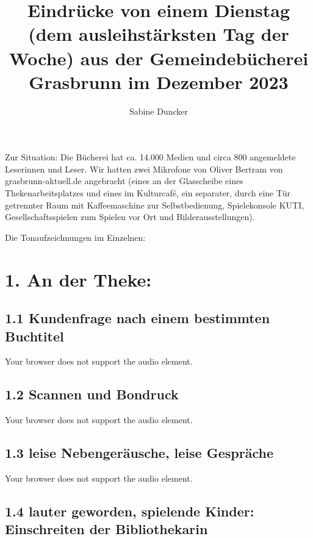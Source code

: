\documentclass[a4paper,
fontsize=11pt,
oneside,
numbers=noperiodatend,
parskip=half-,
bibliography=totoc,
final
]{scrartcl}
\title{\LARGE{Eindrücke von einem Dienstag (dem ausleihstärksten Tag der Woche) aus der Gemeindebücherei Grasbrunn im Dezember 2023}}%
\author{Sabine Duncker} %
\date{}
\begin{document}
\maketitle
\thispagestyle{fancyplain} 


Zur Situation: Die Bücherei hat ca. 14.000 Medien und circa 800
angemeldete Leserinnen und Leser. Wir hatten zwei Mikrofone von Oliver
Bertram von grasbrunn-aktuell.de angebracht (eines an der Glasscheibe
eines Thekenarbeitsplatzes und eines im Kulturcafé, ein separater, durch
eine Tür getrennter Raum mit Kaffeemaschine zur Selbstbedienung,
Spielekonsole KUTI, Gesellschaftsspielen zum Spielen vor Ort und
Bilderausstellungen).

Die Tonaufzeichnungen im Einzelnen:

\hypertarget{an-der-theke}{%
\section{1. An der Theke:}\label{an-der-theke}}

\hypertarget{kundenfrage-nach-einem-bestimmten-buchtitel}{%
\subsection{1.1 Kundenfrage nach einem bestimmten
Buchtitel}\label{kundenfrage-nach-einem-bestimmten-buchtitel}}

Your browser does not support the audio element.

\hypertarget{scannen-und-bondruck}{%
\subsection{1.2 Scannen und Bondruck}\label{scannen-und-bondruck}}

Your browser does not support the audio element.

\hypertarget{leise-nebengeruxe4usche-leise-gespruxe4che}{%
\subsection{1.3 leise Nebengeräusche, leise
Gespräche}\label{leise-nebengeruxe4usche-leise-gespruxe4che}}

Your browser does not support the audio element.

\hypertarget{lauter-geworden-spielende-kinder-einschreiten-der-bibliothekarin}{%
\subsection{1.4 lauter geworden, spielende Kinder: Einschreiten der
Bibliothekarin}\label{lauter-geworden-spielende-kinder-einschreiten-der-bibliothekarin}}
\end{document}

